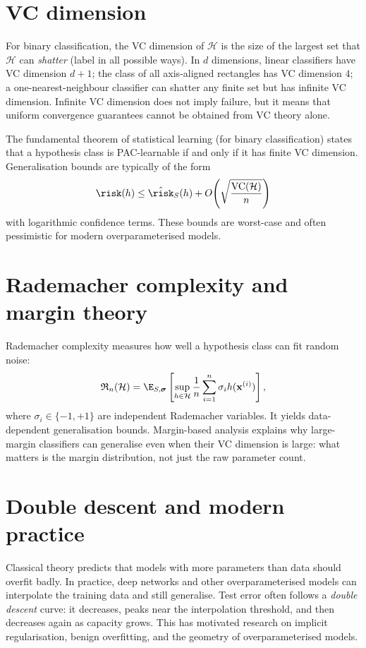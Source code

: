 \documentclass[a4paper, 12pt]{book}
\begin{document}
\section{VC dimension}

For binary classification, the VC dimension of $\mathcal{H}$ is the size of the
largest set that $\mathcal{H}$ can \emph{shatter} (label in all possible ways). In
$d$ dimensions, linear classifiers have VC dimension $d+1$; the class of all
axis-aligned rectangles has VC dimension $4$; a one-nearest-neighbour classifier can
shatter any finite set but has infinite VC dimension. Infinite VC dimension does not
imply failure, but it means that uniform convergence guarantees cannot be obtained
from VC theory alone.

The fundamental theorem of statistical learning (for binary classification) states
that a hypothesis class is PAC-learnable if and only if it has finite VC dimension.
Generalisation bounds are typically of the form
\begin{align}
    \risk(h) \leq \hat{\risk}_S(h)
    + O\!\left(\sqrt{\frac{\mathrm{VC}(\mathcal{H})}{n}}\right)
\end{align}
with logarithmic confidence terms. These bounds are worst-case and often pessimistic
for modern overparameterised models.

\section{Rademacher complexity and margin theory}

Rademacher complexity measures how well a hypothesis class can fit random noise:
\begin{align}
    \mathfrak{R}_n(\mathcal{H})
    = \E_{S,\boldsymbol{\sigma}}\left[
      \sup_{h\in\mathcal{H}}\frac{1}{n}\sum_{i=1}^n \sigma_i h(\mathbf{x}^{(i)})
    \right],
\end{align}
where $\sigma_i \in \{-1,+1\}$ are independent Rademacher variables. It yields
data-dependent generalisation bounds. Margin-based analysis explains why large-margin
classifiers can generalise even when their VC dimension is large: what matters is the
margin distribution, not just the raw parameter count.

\section{Double descent and modern practice}

Classical theory predicts that models with more parameters than data should overfit
badly. In practice, deep networks and other overparameterised models can interpolate
the training data and still generalise. Test error often follows a \emph{double
descent} curve: it decreases, peaks near the interpolation threshold, and then
decreases again as capacity grows. This has motivated research on implicit
regularisation, benign overfitting, and the geometry of overparameterised models.
\end{document}
